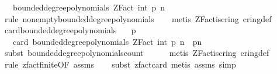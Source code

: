 \begin{isabellebody}
\ \ \ {\isachardoublequoteopen}bounded{\isacharunderscore}{\kern0pt}degree{\isacharunderscore}{\kern0pt}polynomials\ {\isacharparenleft}{\kern0pt}ZFact\ {\isacharparenleft}{\kern0pt}int\ p{\isacharparenright}{\kern0pt}{\isacharparenright}{\kern0pt}\ n\ {\isasymnoteq}\ {\isacharbraceleft}{\kern0pt}{\isacharbraceright}{\kern0pt}{\isachardoublequoteclose}\isanewline
%
\isadelimproof
\ \ %
\endisadelimproof
%
\isatagproof
{}\isamarkupfalse%
\ {\isacharparenleft}{\kern0pt}rule\ non{\isacharunderscore}{\kern0pt}empty{\isacharunderscore}{\kern0pt}bounded{\isacharunderscore}{\kern0pt}degree{\isacharunderscore}{\kern0pt}polynomials{\isacharparenright}{\kern0pt}\isanewline
\ \ \isamarkupfalse%
\ {\isacharparenleft}{\kern0pt}metis\ ZFact{\isacharunderscore}{\kern0pt}is{\isacharunderscore}{\kern0pt}cring\ cring{\isacharunderscore}{\kern0pt}def{\isacharparenright}{\kern0pt}%
\endisatagproof
{\isafoldproof}%
%
\isadelimproof
\isanewline
%
\endisadelimproof
\isanewline
{}\isamarkupfalse%
\ card{\isacharunderscore}{\kern0pt}bounded{\isacharunderscore}{\kern0pt}degree{\isacharunderscore}{\kern0pt}polynomials{\isacharcolon}{\kern0pt}\isanewline
\ \ \ {\isachardoublequoteopen}p\ {\isachargreater}{\kern0pt}\ {}{\isachardoublequoteclose}\isanewline
\ \ \ {\isachardoublequoteopen}card\ {\isacharparenleft}{\kern0pt}bounded{\isacharunderscore}{\kern0pt}degree{\isacharunderscore}{\kern0pt}polynomials\ {\isacharparenleft}{\kern0pt}ZFact\ {\isacharparenleft}{\kern0pt}int\ p{\isacharparenright}{\kern0pt}{\isacharparenright}{\kern0pt}\ n{\isacharparenright}{\kern0pt}\ {\isacharequal}{\kern0pt}\ p{\isacharcircum}{\kern0pt}n{\isachardoublequoteclose}\isanewline
%
\isadelimproof
\ \ %
\endisadelimproof
%
\isatagproof
{}\isamarkupfalse%
\ {\isacharparenleft}{\kern0pt}subst\ bounded{\isacharunderscore}{\kern0pt}degree{\isacharunderscore}{\kern0pt}polynomials{\isacharunderscore}{\kern0pt}count{\isacharparenright}{\kern0pt}\isanewline
\ \ \ \ \isamarkupfalse%
\ {\isacharparenleft}{\kern0pt}metis\ ZFact{\isacharunderscore}{\kern0pt}is{\isacharunderscore}{\kern0pt}cring\ cring{\isacharunderscore}{\kern0pt}def{\isacharparenright}{\kern0pt}\isanewline
\ \ \ \isamarkupfalse%
\ {\isacharparenleft}{\kern0pt}rule\ zfact{\isacharunderscore}{\kern0pt}finite{\isacharbrackleft}{\kern0pt}OF\ assms{\isacharbrackright}{\kern0pt}{\isacharparenright}{\kern0pt}\isanewline
\ \ \isamarkupfalse%
\ {\isacharparenleft}{\kern0pt}subst\ zfact{\isacharunderscore}{\kern0pt}card{\isacharcomma}{\kern0pt}\ metis\ assms{\isacharcomma}{\kern0pt}\ simp{\isacharparenright}{\kern0pt}%

\end{isabellebody}
